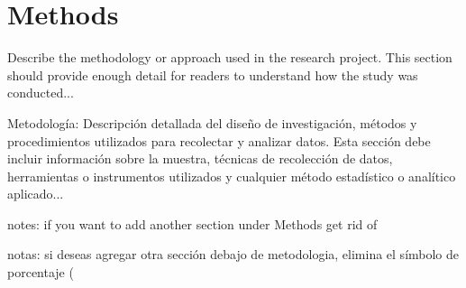 \section{Methods}
Describe the methodology or approach used in the research project. This section should provide enough detail for readers to understand how the study was conducted... 

Metodología: Descripción detallada del diseño de investigación, métodos y procedimientos utilizados para recolectar y analizar datos. Esta sección debe incluir información sobre la muestra, técnicas de recolección de datos, herramientas o instrumentos utilizados y cualquier método estadístico o analítico aplicado... 

notes: if you want to add another section under Methods get rid of %

notas: si deseas agregar otra sección debajo de metodologia, elimina el símbolo de porcentaje (%

